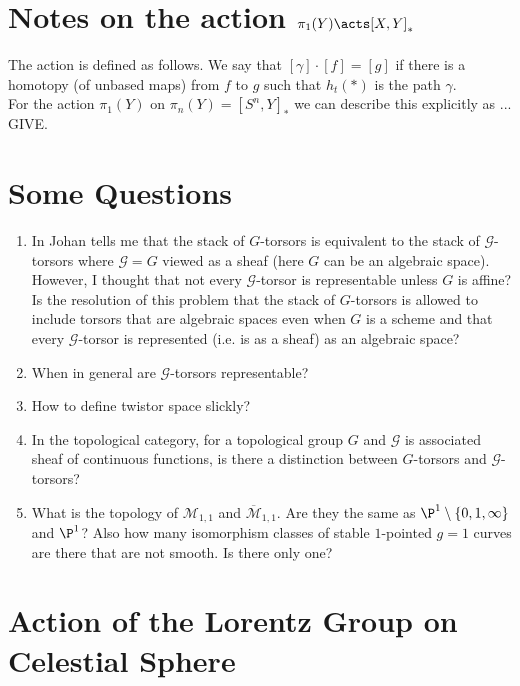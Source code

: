 \documentclass[12pt]{article}
\begin{document}
\section{Notes on the action $\pi_1(Y) \acts [X, Y]_* $}

The action is defined as follows. We say that $[\gamma] \cdot [f] = [g]$ if there is a homotopy (of unbased maps) from $f$ to $g$ such that $h_t(*)$ is the path $\gamma$. 
\bigskip\\
For the action $\pi_1(Y)$ on $\pi_n(Y) = [S^n, Y]_*$ we can describe this explicitly as ... GIVE.

\section{Some Questions}

\begin{enumerate}
\item In  Johan tells me that the stack of $G$-torsors is equivalent to the stack of $\mathcal{G}$-torsors where $\mathcal{G} = G$ viewed as a sheaf (here $G$ can be an algebraic space). However, I thought that not every $\mathcal{G}$-torsor is representable unless $G$ is affine? Is the resolution of this problem that the stack of $G$-torsors is allowed to include torsors that are algebraic spaces even when $G$ is a scheme and that every $\mathcal{G}$-torsor is represented (i.e. is as a sheaf) as an algebraic space?

\item When in general are $\mathcal{G}$-torsors representable?

\item How to define twistor space slickly?

\item In the topological category, for a topological group $G$ and $\mathcal{G}$ is associated sheaf of continuous functions, is there a distinction between $G$-torsors and $\mathcal{G}$-torsors?

\item What is the topology of $\mathcal{M}_{1,1}$ and $\overline{\mathcal{M}}_{1,1}$. Are they the same as $\P^1 \setminus \{ 0,1,\infty \}$ and $\P^1$? Also how many isomorphism classes of stable $1$-pointed $g = 1$ curves are there that are not smooth. Is there only one?
\end{enumerate}

\section{Action of the Lorentz Group on Celestial Sphere}
\end{document}
